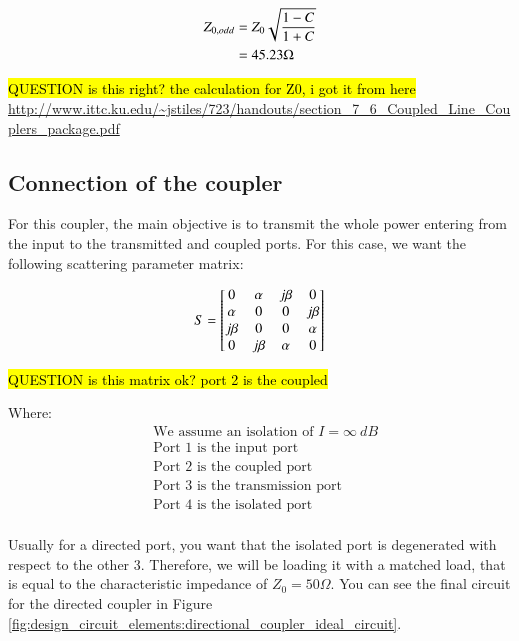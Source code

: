\documentclass[12pt]{report} %
\newcommand{\question}[1]{\sethlcolor{red}\hl{QUESTION #1}}
\begin{document}
\begin{align*}
Z_{0, odd} &= Z_{0} \* \sqrt{\frac{1 - C}{1 + C}} \\
&= 45.23 \Omega \\
\end{align*}

\question{is this right? the calculation for Z0, i got it from here}
\url{http://www.ittc.ku.edu/~jstiles/723/handouts/section_7_6_Coupled_Line_Couplers_package.pdf}

\subsection{Connection of the coupler}

For this coupler, the main objective is to transmit the whole power entering from the input to the transmitted and coupled ports. For this case, we want the following scattering parameter matrix:

\[
S = \begin{bmatrix}
0 & \alpha & j \* \beta & 0 \\
\alpha & 0 & 0 & j \* \beta \\
j \* \beta & 0 & 0 & \alpha \\
0 & j \* \beta & \alpha & 0 \\
\end{bmatrix}
\]

\question{is this matrix ok? port 2 is the coupled}

Where:
\begin{align*}
& \text{We assume an isolation of $I = \infty \ dB$}  \\
& \text{Port 1 is the input port} \\
& \text{Port 2 is the coupled port} \\
& \text{Port 3 is the transmission port} \\
& \text{Port 4 is the isolated port} \\
\end{align*}

Usually for a directed port, you want that the isolated port is degenerated with respect to the other 3. Therefore, we will be loading it with a matched load, that is equal to the characteristic impedance of $Z_0 = 50 \Omega$. You can see the final circuit for the directed coupler in Figure \ref{fig:design_circuit_elements:directional_coupler_ideal_circuit}.
\end{document}
